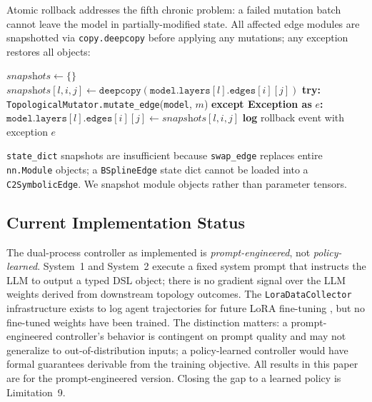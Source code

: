 \documentclass[11pt,a4paper]{article}
\begin{document}
Atomic rollback addresses the fifth chronic problem: a failed mutation batch cannot
leave the model in partially-modified state. All affected edge modules are snapshotted
via \texttt{copy.deepcopy} before applying any mutations; any exception restores all
objects:

\begin{algorithm}
\caption{Atomic Mutation Application with Rollback}
\begin{algorithmic}[1]
\State $\textit{snapshots} \leftarrow \{\}$
    \State $\textit{snapshots}[l,i,j] \leftarrow \texttt{deepcopy}(\texttt{model.layers}[l].\texttt{edges}[i][j])$
\EndFor
\State \textbf{try:}
    \State \texttt{TopologicalMutator.mutate\_edge}(\texttt{model}, $m$)
\EndFor
\State \textbf{except Exception as} $e$\textbf{:}
    \State $\texttt{model.layers}[l].\texttt{edges}[i][j] \leftarrow \textit{snapshots}[l,i,j]$
\EndFor
\State \textbf{log} rollback event with exception $e$
\end{algorithmic}
\end{algorithm}

\texttt{state\_dict} snapshots are insufficient because \texttt{swap\_edge} replaces
entire \texttt{nn.Module} objects; a \texttt{BSplineEdge} state dict cannot be loaded
into a \texttt{C2SymbolicEdge}. We snapshot module objects rather than parameter tensors.

\subsection{Current Implementation Status}
\label{sec:agent:status}

The dual-process controller as implemented is \emph{prompt-engineered}, not
\emph{policy-learned}. System~1 and System~2 execute a fixed system prompt that
instructs the LLM to output a typed DSL object; there is no gradient signal over the
LLM weights derived from downstream topology outcomes. The \texttt{LoraDataCollector}
infrastructure exists to log agent trajectories for future LoRA fine-tuning
\citep{hu2021lora}, but no fine-tuned weights have been trained. The distinction
matters: a prompt-engineered controller's behavior is contingent on prompt quality
and may not generalize to out-of-distribution inputs; a policy-learned controller
would have formal guarantees derivable from the training objective. All results in
this paper are for the prompt-engineered version. Closing the gap to a learned policy
is Limitation~9.
\end{document}
